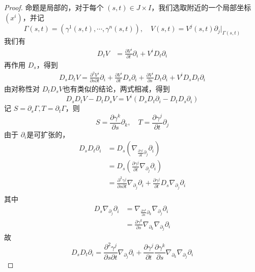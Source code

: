 \documentclass[../../几何与拓扑.tex]{subfiles}
\begin{document}
\begin{proof}
    命题是局部的，对于每个 \(  \left( s,t  \right) \in J\times I   \)，我们选取附近的一个局部坐标 \(  \left( x^{i} \right)   \)，并记 \[
     \Gamma \left( s,t \right)= \left(  \gamma ^{1}\left( s,t \right),\cdots , \gamma ^{n}\left( s,t \right)   \right)  ,\quad V\left( s,t \right)= V^{j}\left( s,t \right) \partial _{j}|_{ \Gamma \left( s,t \right)  }  
    \]  我们有 \[
    \begin{aligned}
    D_{t}V& =  \frac{\partial V^{i}}{\partial t}\partial _{i}+ V^{i}D_{t}\partial _{i}
    \end{aligned}
    \]再作用 \(  D_{s}  \)，得到 \[
    \begin{aligned}
    D_{s} D_{t}V=  \frac{\partial ^{2}V^{i}}{\partial s \partial t}\partial _{i}+ \frac{\partial V^{i}}{\partial t} D_{s}\partial _{i}+  \frac{\partial V^{i}}{\partial s}D_{t}\partial _{i}+ V^{i}D_{s}D_{t}\partial _{i} 
    \end{aligned}
    \] 由对称性对 \(  D_{t}D_{s}V  \)也有类似的结论，两式相减，得到 \[
    D_{s}D_{t}V-D_{t}D_{s}V= V^{i}\left( D_{s}D_{t}\partial _{i} -D_{t}D_{s}\partial _{i}  \right)
    \] 记 \(  S =  \partial _{s} \Gamma ,T=  \partial _{t} \Gamma   \)，则 \[
    S =  \frac{\partial  \gamma ^{k}}{\partial s}\partial _{k},\quad  T =  \frac{\partial  \gamma ^{j}}{\partial t}\partial _{j}
    \] 由于 \(  \partial _{i}  \)是可扩张的， \[
    \begin{aligned}
    D_{s}D_{t}\partial _{i}& = D_{s}\left(  \nabla _{\frac{\partial  \gamma ^{j}}{\partial t}\partial _{j}}\partial _{i} \right)\\ 
      & =D_{s}\left( \frac{\partial  \gamma ^{j}}{\partial t} \nabla _{\partial _{j}}\partial _{i} \right)\\ 
       & =  \frac{\partial ^{2} \gamma ^{j}}{\partial s \partial t}  \nabla _{\partial _{j}}\partial _{i}+ \frac{\partial  \gamma ^{j}}{\partial t}D_{s} \nabla _{\partial _{j}}\partial _{i}\\     
    \end{aligned}
    \] 其中 \[
    \begin{aligned}
    D_{s} \nabla _{\partial _{j}}\partial _{i}& =   \nabla _{\frac{\partial  \gamma ^{k}}{\partial s}\partial _{k}} \nabla _{\partial _{j}}\partial _{i}\\ 
     & = \frac{\partial  \gamma ^{k}}{\partial s}  \nabla _{\partial _{k}} \nabla _{\partial _{j}}\partial _{i} 
    \end{aligned}
    \]故 \[
    D_{s}D_{t}\partial _{i}=  \frac{\partial ^{2} \gamma ^{j}}{\partial s \partial t} \nabla _{\partial _{j}}\partial _{i}+ \frac{\partial  \gamma ^{j}}{\partial t} \frac{\partial  \gamma ^{k}}{\partial s} \nabla _{\partial _{k}} \nabla _{\partial _{j}}\partial _{i}
\]
\end{proof}
\end{document}
